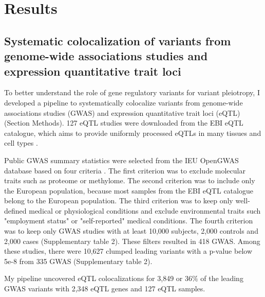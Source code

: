 \section*{Results}\label{s:results}

\subsection*{Systematic colocalization of variants from genome-wide associations studies and expression quantitative trait loci}

To better understand the role of gene regulatory variants for variant pleiotropy,
I developed a pipeline to systematically colocalize variants from genome-wide associations
studies (GWAS) and expression quantitative trait loci (eQTL) (Section Methods).
%
127 eQTL studies were downloaded from the EBI eQTL catalogue, which aims to provide uniformly processed eQTLs in many tissues and cell types \citep{2021.Alasoo.Kerimov}.

Public GWAS summary statistics were selected from the IEU OpenGWAS database based on four criteria \citep{2018.Parkinson.Buniello}.
%
The first criterion was to exclude molecular traits such as proteome or methylome.
%	
The second criterion was to include only the European population, because most
samples from the EBI eQTL catalogue belong to the European population.
%
The third criterion was to keep only well-defined medical or physiological
conditions and exclude environmental traits such "employment status" or "self-reported" medical conditions.
%
The fourth criterion was to keep only GWAS studies with at least 10,000 subjects, 2,000 controls and 2,000 cases (Supplementary table 2).
%
These filters resulted in 418 GWAS.
%
Among these studies, there were 10,627 clumped leading variants with a p-value below 5e-8 from 335 GWAS (Supplementary table 2).

My pipeline uncovered eQTL colocalizations for 3,849 or 36$\%$ of the leading GWAS variants with 2,348 eQTL genes and 127 eQTL samples.

